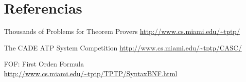 \chapter{Referencias}

\begin{thebibliography}{9}

	Thousands of Problems for Theorem Provers
	\url{http://www.cs.miami.edu/~tptp/}

	The CADE ATP System Competition
	\url{http://www.cs.miami.edu/~tptp/CASC/}

	FOF: First Orden Formula
	\url{http://www.cs.miami.edu/~tptp/TPTP/SyntaxBNF.html}

\end{thebibliography}

